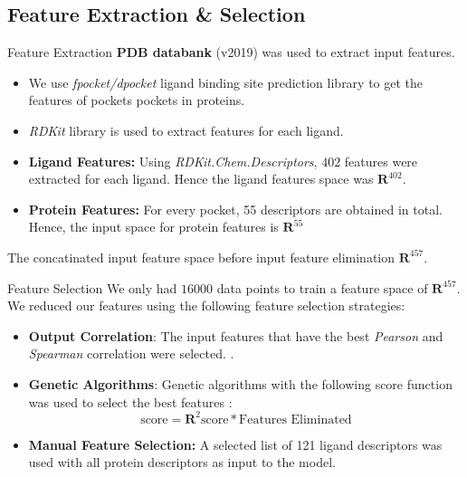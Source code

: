 \documentclass{beamer}
\begin{document}
\subsection{Feature Extraction \& Selection}

\begin{frame}[t]{Feature Extraction}
\textbf{PDB databank} (v2019) was used to extract input features.
\begin{itemize}
\item We use \textit{fpocket/dpocket} ligand binding site prediction library to get the features of pockets pockets in proteins.
\item \textit{RDKit} library is used to extract features for each ligand.
\item \textbf{Ligand Features:} Using \textit{RDKit.Chem.Descriptors}, $402$ features were extracted for each ligand.  Hence the ligand features space was $\mathbf{R}^{402}$.
\item \textbf{Protein Features:} For every pocket,  55 descriptors are obtained in total. Hence, the input space for protein features is $\mathbf{R}^{55}$
\end{itemize}
The concatinated input feature space before input feature elimination $\mathbf{R}^{457}$.

\end{frame}

\begin{frame}[t]{Feature Selection}
We only had $16000$ data points to train a feature space of $\mathbf{R}^{457}$. 
We reduced our features using the following feature selection strategies:
\begin{itemize}
\item \textbf{Output Correlation}: The input features that have the best \textit{Pearson} and \textit{Spearman} correlation were selected. \cite{spearmanpearsoncorrelation}.
\item \textbf{Genetic Algorithms}: Genetic algorithms with the following score function was used to select the best features \cite{geneticalgorithmsresearchpaper}:
$$
\textrm{score} = \mathbf{R}^2 \textrm{score} * \textrm{Features Eliminated}
$$
\item \textbf{Manual Feature Selection:} A selected list of 121 ligand descriptors was
used with all protein descriptors as input to the model.
\end{itemize} 
\end{frame}
\end{document}
